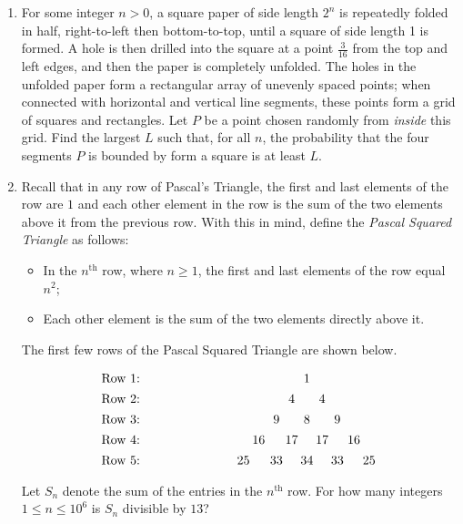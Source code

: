 \documentclass[10pt]{article}
\begin{document}
\begin{enumerate}
\item For some integer $n > 0$, a square paper of side length $2^{n}$ is
	repeatedly folded in half, right-to-left then bottom-to-top, until a
square of side length 1 is formed. A hole is then drilled into the square at a
point $\tfrac{3}{16}$ from the top and left edges, and then the paper is
completely unfolded. The holes in the unfolded paper form a rectangular array of
unevenly spaced points; when connected with horizontal and vertical line
segments, these points form a grid of squares and rectangles. Let $P$ be a point
chosen randomly from \textit{inside} this grid. Find the largest $L$ such that,
for all $n$, the probability that the four segments $P$ is bounded by form a
square is at least $L$. %

\item Recall that in any row of Pascal's Triangle, the first and last elements of the row are $1$ and each other element in the row is the sum of the two elements above it from the previous row.  With this in mind, define the \textit{Pascal Squared Triangle} as follows:

\begin{itemize}

\item In the $n^{\text{th}}$ row, where $n\geq 1$, the first and last elements of the row equal $n^2$;

\item Each other element is the sum of the two elements directly above it.

\end{itemize}

The first few rows of the Pascal Squared Triangle are shown below.

\[\begin{array}{c@{\hspace{7em}}
c@{\hspace{2pt}}c@{\hspace{2pt}}c@{\hspace{4pt}}c@{\hspace{2pt}}
c@{\hspace{2pt}}c@{\hspace{2pt}}c@{\hspace{2pt}}c@{\hspace{3pt}}c@{\hspace{2pt}}
c@{\hspace{2pt}}c} \vspace{4pt}
\text{Row 1: } & & & & & & 1 & & & & & \\\vspace{4pt}
\text{Row 2: } & & & & & 4 & & 4 & & & & \\\vspace{4pt}
\text{Row 3: } & & & & 9 & & 8 & & 9 & & & \\\vspace{4pt}
\text{Row 4: } & & &16& &17& &17& & 16& & \\\vspace{4pt}
\text{Row 5: } & &25 & &33& &34 & &33 & &25 &
\end{array}\]
Let $S_n$ denote the sum of the entries in the $n^{\text{th}}$ row.  For how many integers $1\leq n\leq 10^6$ is $S_n$ divisible by $13$? %


\end{enumerate}
\end{document}
